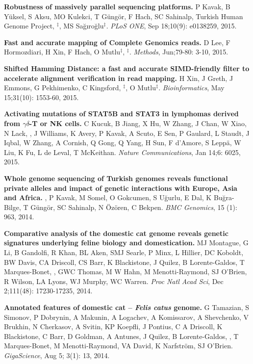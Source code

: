 \vspace{-.2cm}        
    {\bf Robustness of massively parallel sequencing platforms.}
    P Kavak, B Yüksel, S Aksu, MO Kulekci, T Güngör, F Hach, SC Sahinalp, Turkish Human Genome Project, \calkan{}$^\ddag$,
    MS Sağıroğlu$^\ddag$.    
    {\em PLoS ONE},  Sep 18;10(9): e0138259, 2015.  

\vspace{-.2cm}        
    {\bf Fast and accurate mapping of Complete Genomics reads.}
    D Lee, F Hormozdiari, H Xin, F Hach, O Mutlu$^\ddag$,  \calkan{}$^\ddag$.
    {\em Methods}, Jun;79-80: 3-10, 2015. 


\vspace{-.2cm}        
    {\bf Shifted Hamming Distance: a fast and accurate SIMD-friendly filter to accelerate alignment verification in read mapping.} H Xin, J Greth, J Emmons, 
    G Pekhimenko, C Kingsford, \calkan{}$^\ddag$,  O Mutlu$^\ddag$. {\em Bioinformatics},  May 15;31(10): 1553-60, 2015.

\vspace{-.2cm}        
    {\bf Activating mutations of STAT5B and STAT3 in lymphomas derived from $\gamma\delta$-T or NK cells.}
    C Kucuk, B Jiang, X Hu, W Zhang, J Chan, W Xiao, N Lack,   \calkan{},  J Williams, K Avery, P Kavak, A Scuto, E Sen,  P Gaulard, L Staudt, J Iqbal,  W Zhang,  A Cornish, Q Gong, Q  Yang, H Sun, F d'Amore, S Leppä, W Liu, K Fu, L de Leval, T McKeithan.
    {\em Nature Communications}, Jan 14;6: 6025, 2015.


\vspace{-.2cm}        
    {\bf Whole genome sequencing of Turkish genomes reveals functional private alleles and impact of genetic interactions with Europe, Asia and Africa.}
    \calkan{}, P Kavak, M Somel, O Gokcumen, S Uğurlu, E Dal, K Buğra-Bilge,  T Güngör, SC Sahinalp, N Özören, C Bekpen.
    {\em BMC Genomics}, 15 (1): 963, 2014.

\vspace{-.2cm}        
    {\bf Comparative analysis of the domestic cat genome reveals genetic signatures underlying feline biology and domestication.}
    MJ Montague, G Li, B Gandolfi, R Khan, BL Aken, SMJ Searle, P Minx, L Hillier, DC Koboldt, BW Davis, CA Driscoll, CS Barr, K Blackistone, J Quilez, B Lorente-Galdos, T Marques-Bonet, \calkan{}, GWC Thomas, M W Hahn, M Menotti-Raymond, SJ O’Brien, R Wilson, LA Lyons, WJ Murphy, WC Warren. 
    {\em Proc Natl Acad Sci}, Dec 2;111(48): 17230-17235, 2014.

\vspace{-.2cm}        
    {\bf Annotated features of domestic cat – \textit{Felis catus} genome.}
    G Tamazian, S Simonov, P Dobrynin, A Makunin, A Logachev, A Komissarov, A Shevchenko, V Brukhin, N Cherkasov, A Svitin, KP Koepfli, J Pontius, C A Driscoll, K Blackistone, C Barr, D Goldman, A Antunes, J Quilez, B Lorente-Galdos,  \calkan{}, T Marques-Bonet, M Menotti-Raymond, VA David, K Narfström, SJ O’Brien.
    {\em GigaScience}, Aug 5; 3(1): 13, 2014.
                   
